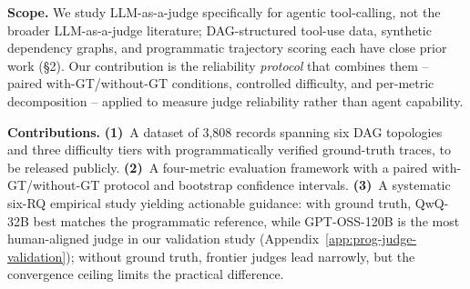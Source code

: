 \noindent\textbf{Scope.} We study LLM-as-a-judge specifically for agentic tool-calling, not the broader LLM-as-a-judge literature; DAG-structured tool-use data, synthetic dependency graphs, and programmatic trajectory scoring each have close prior work (\S2). Our contribution is the reliability \emph{protocol} that combines them -- paired with-GT/without-GT conditions, controlled difficulty, and per-metric decomposition -- applied to measure judge reliability rather than agent capability.

\noindent\textbf{Contributions.} \textbf{(1)}~A dataset of 3,808 records spanning six DAG topologies and three difficulty tiers with programmatically verified ground-truth traces, to be released publicly. \textbf{(2)}~A four-metric evaluation framework with a paired with-GT/without-GT protocol and bootstrap confidence intervals. \textbf{(3)}~A systematic six-RQ empirical study yielding actionable guidance: with ground truth, QwQ-32B best matches the programmatic reference, while GPT-OSS-120B is the most human-aligned judge in our validation study (Appendix~\ref{app:prog-judge-validation}); without ground truth, frontier judges lead narrowly, but the convergence ceiling limits the practical difference.
